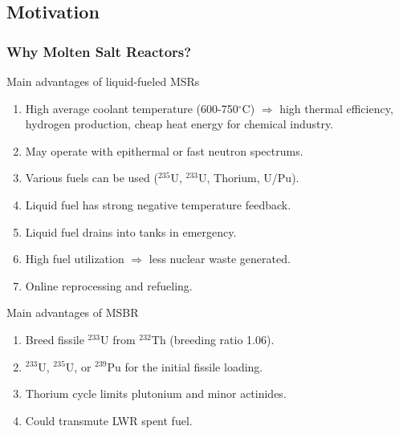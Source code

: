 \subsection{Motivation}
\begin{frame}
  \frametitle{Why Molten Salt Reactors?}
                  \vspace*{-0.1in}
              \begin{block}{Main advantages of liquid-fueled \glspl{MSR} \cite{elsheikh_safety_2013}}
               \begin{enumerate}
                \item High average coolant temperature (600-750$^{\circ}$C) $\Rightarrow$ high thermal efficiency,
hydrogen production, cheap heat energy for chemical industry.
                \item May operate with epithermal or fast neutron spectrums.
                \item Various fuels can be used ($^{235}$U, $^{233}$U, Thorium, U/Pu).
                \item Liquid fuel has strong negative temperature feedback.
                \item Liquid fuel drains into tanks in emergency.
                \item High fuel utilization $\Rightarrow$ less nuclear waste generated.
                \item Online reprocessing and refueling.
               \end{enumerate}
               \end{block}
                  \vspace*{-0.1in}               
               \begin{block}{Main advantages of \gls{MSBR} \cite{robertson_conceptual_1971}}
               \begin{enumerate}
                \item Breed fissile $^{233}$U from $^{232}$Th (breeding ratio 1.06).
                \item $^{233}$U, $^{235}$U, or $^{239}$Pu for the initial fissile loading.
                \item Thorium cycle limits plutonium and minor actinides.
                \item Could transmute \gls{LWR} spent fuel.
               \end{enumerate}
               \end{block}

\end{frame}

